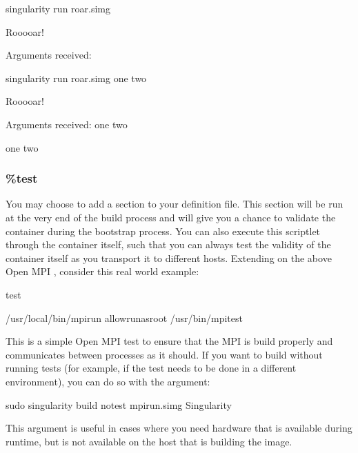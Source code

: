 \documentclass[letterpaper,10pt,english]{sphinxmanual}
\begin{document}
%
\begin{sphinxVerbatim}[commandchars=\\\{\}]
\PYGZdl{} singularity run roar.simg

Rooooar!

Arguments received:


\PYGZdl{} singularity run roar.simg one two

Rooooar!

Arguments received: one two

one two
\end{sphinxVerbatim}


\subsubsection{\%test}
\label{\detokenize{container_recipes:test}}
You may choose to add a  section to your definition file. This section
will be run at the very end of the build process and will give you a
chance to validate the container during the bootstrap process. You can
also execute this scriptlet through the container itself, such that you
can always test the validity of the container itself as you transport it
to different hosts. Extending on the above Open MPI , consider this real
world example:

%
\begin{sphinxVerbatim}[commandchars=\\\{\}]
\PYGZpc{}test

    /usr/local/bin/mpirun \PYGZhy{}\PYGZhy{}allow\PYGZhy{}run\PYGZhy{}as\PYGZhy{}root /usr/bin/mpi\PYGZus{}test
\end{sphinxVerbatim}

This is a simple Open MPI test to ensure that the MPI is build
properly and communicates between processes as it should.
If you want to build without running tests (for example, if the test
needs to be done in a different environment), you can do so with the
 argument:

%
\begin{sphinxVerbatim}[commandchars=\\\{\}]
\PYGZdl{} sudo singularity build \PYGZhy{}\PYGZhy{}notest mpirun.simg Singularity
\end{sphinxVerbatim}

This argument is useful in cases where you need hardware that is
available during runtime, but is not available on the host that is
building the image.
\end{document}
